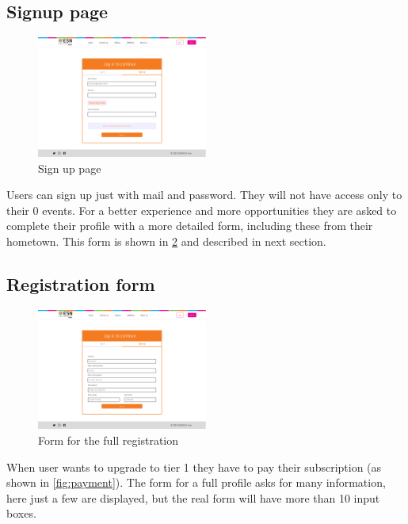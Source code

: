 \subsection{Signup page}
\begin{figure}[H]
    \centering
    \includegraphics[width=0.5\textwidth]{images/signup.png}
    \caption{Sign up page}
    \label{fig:signup page}
\end{figure}
Users can sign up just with mail and password. They will not have access only to their
0 events. For a better experience and more opportunities
they are asked to complete their profile with a more detailed form, including these from
their hometown. This form is shown in \ref{fig:form} and described in next section.
\subsection{Registration form}
\begin{figure}[H]
    \centering
    \includegraphics[width=0.5\textwidth]{images/form.png}
    \caption{Form for the full registration}
    \label{fig:form}
\end{figure}
When user wants to upgrade to tier 1 they have to pay their subscription (as shown in \ref{fig:payment}).
The form for a full profile asks for many information, here just a few are displayed, but the 
real form will have more than 10 input boxes. 
